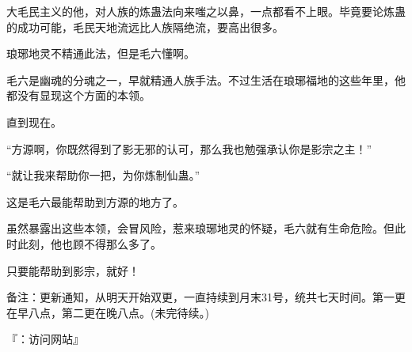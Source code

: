 \begin{this_body}
大毛民主义的他，对人族的炼蛊法向来嗤之以鼻，一点都看不上眼。毕竟要论炼蛊的成功可能，毛民天地流远比人族隔绝流，要高出很多。

琅琊地灵不精通此法，但是毛六懂啊。

毛六是幽魂的分魂之一，早就精通人族手法。不过生活在琅琊福地的这些年里，他都没有显现这个方面的本领。

直到现在。

“方源啊，你既然得到了影无邪的认可，那么我也勉强承认你是影宗之主！”

“就让我来帮助你一把，为你炼制仙蛊。”

这是毛六最能帮助到方源的地方了。

虽然暴露出这些本领，会冒风险，惹来琅琊地灵的怀疑，毛六就有生命危险。但此时此刻，他也顾不得那么多了。

只要能帮助到影宗，就好！

备注：更新通知，从明天开始双更，一直持续到月末31号，统共七天时间。第一更在早八点，第二更在晚八点。(未完待续。)

『：访问网站』

\end{this_body}

